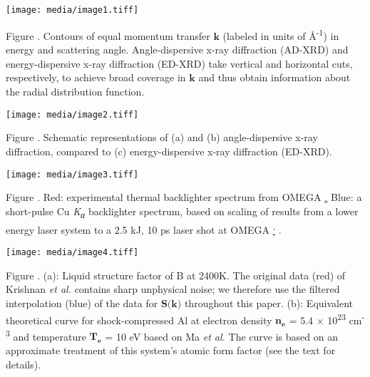 \subsection{}\label{section-1}

\subsection{}\label{section-2}

\subsection{}\label{section-3}

\texttt{[image: media/image1.tiff]}

Figure . Contours of equal momentum transfer \(\mathbf{k}\) (labeled in
units of Å\textsuperscript{-1}) in energy and scattering angle.
Angle-dispersive x-ray diffraction (AD-XRD) and energy-dispersive x-ray
diffraction (ED-XRD) take vertical and horizontal cuts, respectively, to
achieve broad coverage in \(\mathbf{k}\) and thus obtain information
about the radial distribution function.

\texttt{[image: media/image2.tiff]}

Figure . Schematic representations of (a) and (b) angle-dispersive x-ray
diffraction, compared to (c) energy-dispersive x-ray diffraction
(ED-XRD).

\texttt{[image: media/image3.tiff]}

Figure . Red: experimental thermal
backlighter spectrum from OMEGA
\hyperref[b.-yaakobi-2012-private-communication.]\emph{.}
Blue: a short-pulse Cu \emph{K\textsubscript{α}} backlighter spectrum,
based on scaling of results from a lower energy laser system to a 2.5
kJ, 10 ps laser shot at OMEGA
\hyperref[p.-m.-nilson-2012-private-communication.]\textsuperscript{,}
\hyperref[k.-u.-akli-et-al.-physics-of-plasmas-14-023102-2007.]\cite{AKLI2007TEMPERATURE}\hyperref[b.-a.-mattern-g.-t.-seidler-j.-j.-kas-j.-i.-pacold-and-j.-j.-rehr-physical-review-b-85-115135-2012.]{}.

\texttt{[image: media/image4.tiff]}

Figure . (a): Liquid structure factor of B at 2400K. The original data
(red) of Krishnan \emph{et al.}
\hyperref[s.-krishnan-s.-ansell-j.-j.-felten-k.-j.-volin-and-d.-l.-price-physical-review-letters-81-586-1998.]\cite{KRISHNAN1998STRUCTURE}
contains sharp unphysical noise; we therefore use the filtered
interpolation (blue) of the data for
\(\mathbf{S}\mathbf{(}\mathbf{k}\mathbf{)}\) throughout this paper. (b):
Equivalent theoretical curve for shock-compressed Al at electron density
\(\mathbf{n}_{\mathbf{e}}\) = 5.4 × 10\textsuperscript{23}
cm\textsuperscript{-3} and temperature \(\mathbf{T}_{\mathbf{e}}\) = 10
eV based on Ma \emph{et al.}
\hyperref[t.-ma-et-al.-physical-review-letters-110-065001-2013.]\cite{MA2013X}
The curve is based on an approximate treatment of this system's atomic
form factor (see the text for details).

